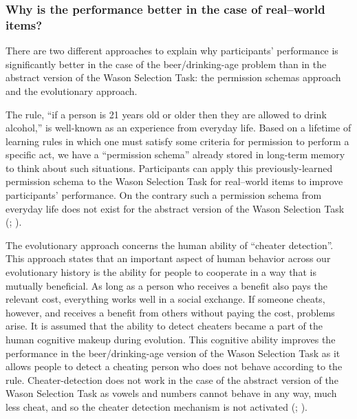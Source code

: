 \documentclass[
]{krantz}
\begin{document}
\subsubsection*{Why is the performance better in the case of real--world items?}\label{why-is-the-performance-better-in-the-case-of-realworld-items}


There are two different approaches to explain why participants' performance is significantly better in the case of the beer/drinking-age problem than in the abstract version of the Wason Selection Task: the permission schemas approach and the evolutionary approach.

The rule, ``if a person is 21 years old or older then they are allowed to drink alcohol,'' is well-known as an experience from everyday life. Based on a lifetime of learning rules in which one must satisfy some criteria for permission to perform a specific act, we have a ``permission schema'' already stored in long-term memory to think about such situations. Participants can apply this previously-learned permission schema to the Wason Selection Task for real--world items to improve participants' performance. On the contrary such a permission schema from everyday life does not exist for the abstract version of the Wason Selection Task (; ).

The evolutionary approach concerns the human ability of ``cheater detection''. This approach states that an important aspect of human behavior across our evolutionary history is the ability for people to cooperate in a way that is mutually beneficial. As long as a person who receives a benefit also pays the relevant cost, everything works well in a social exchange. If someone cheats, however, and receives a benefit from others without paying the cost, problems arise. It is assumed that the ability to detect cheaters became a part of the human cognitive makeup during evolution. This cognitive ability improves the performance in the beer/drinking-age version of the Wason Selection Task as it allows people to detect a cheating person who does not behave according to the rule. Cheater-detection does not work in the case of the abstract version of the Wason Selection Task as vowels and numbers cannot behave in any way, much less cheat, and so the cheater detection mechanism is not activated (; ).
\end{document}

